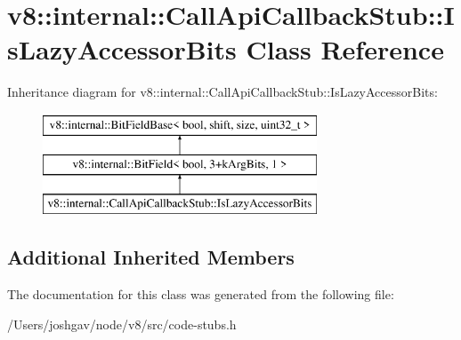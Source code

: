 \hypertarget{classv8_1_1internal_1_1_call_api_callback_stub_1_1_is_lazy_accessor_bits}{}\section{v8\+:\+:internal\+:\+:Call\+Api\+Callback\+Stub\+:\+:Is\+Lazy\+Accessor\+Bits Class Reference}
\label{classv8_1_1internal_1_1_call_api_callback_stub_1_1_is_lazy_accessor_bits}
Inheritance diagram for v8\+:\+:internal\+:\+:Call\+Api\+Callback\+Stub\+:\+:Is\+Lazy\+Accessor\+Bits\+:\begin{figure}[H]
\begin{center}
\leavevmode
\includegraphics[height=3.000000cm]{classv8_1_1internal_1_1_call_api_callback_stub_1_1_is_lazy_accessor_bits}
\end{center}
\end{figure}
\subsection*{Additional Inherited Members}


The documentation for this class was generated from the following file\+:\begin{DoxyCompactItemize}
\item 
/\+Users/joshgav/node/v8/src/code-\/stubs.\+h\end{DoxyCompactItemize}
